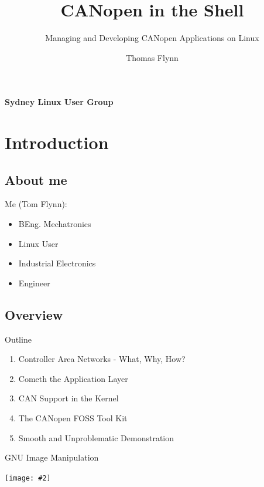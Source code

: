 \documentclass{beamer}
\title{CANopen in the Shell}
\subtitle{Managing and Developing CANopen Applications on Linux}
\author{Thomas Flynn}
\newcommand {\framedgraphic}[2] {
    \begin{frame}{#1}
        \begin{center}
            \texttt{[image: \#2]}
        \end{center}
    \end{frame}
}
\begin{document}
 

  \begin{frame}
    \framesubtitle{\textbf{S}ydney \textbf{L}inux \textbf{U}ser \textbf{Group}}
    
    \titlepage
  \end{frame}

  
\section*{Introduction}

\subsection*{About me}
\begin{frame}
    \huge{Me (Tom Flynn):}
    \begin{itemize}
      \item{BEng. Mechatronics}
      \item{Linux User}
      \item{Industrial Electronics}
      \item{Engineer}
    \end{itemize}
    \end{frame}
  
\subsection*{Overview}
  \begin{frame}{Outline}
    \begin{enumerate}
    \item{Controller Area Networks - What, Why, How?}
      \pause
    \item{Cometh the Application Layer}
      \pause
    \item{CAN Support in the Kernel}
      \pause
    \item{The CANopen FOSS Tool Kit}
      \pause
      \item{Smooth and Unproblematic Demonstration}
   \end{enumerate}        
\end{frame}
  
  \framedgraphic{GNU Image Manipulation}{./images/title_slide}
\end{document}
